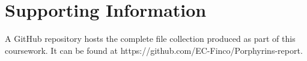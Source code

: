 \documentclass[twoside,twocolumn,9pt]{article}
\renewcommand{\refname}{Notes and references}
\begin{document}
\section*{Supporting Information}
A GitHub repository hosts the complete file collection produced as part of this coursework.
It can be found at https://github.com/EC-Finco/Porphyrins-report.


\balance


\end{document}
